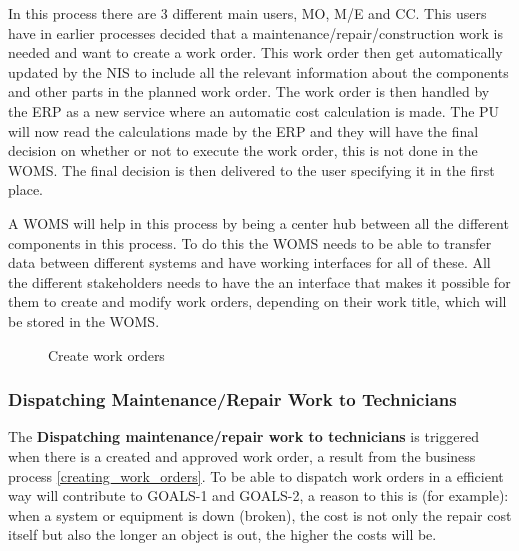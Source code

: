 In this process there are 3 different main users, MO, M/E and CC. This users have in earlier processes decided that a maintenance/repair/construction work is needed and want to create a work order. This work order then get automatically updated by the NIS to include all the relevant information about the components and other parts in the planned work order. The work order is then handled by the ERP as a new service where an automatic cost calculation is made. The PU will now read the calculations made by the ERP and they will have the final decision on whether or not to execute the work order, this is not done in the WOMS. The final decision is then delivered to the user specifying it in the first place.

A WOMS will help in this process by being a center hub between all the different components in this process. To do this the WOMS needs to be able to transfer data between different systems and have working interfaces for all of these. All the different stakeholders needs to have the an interface that makes it possible for them to create and modify work orders, depending on their work title, which will be stored in the WOMS.
\begin{figure}[H]
	\centering
	\setlength\fboxsep{7pt}
	\setlength\fboxrule{0.5pt}
	\label{fig:create}
	\caption{Create work orders}
\end{figure}
%
\subsubsection{Dispatching Maintenance/Repair Work to Technicians}
\label{sec:bp3}
The \textbf{Dispatching maintenance/repair work to technicians} is triggered when there is a created and approved work order, a result from the business process \ref{creating_work_orders}. To be able to dispatch work orders in a efficient way will contribute to GOALS-1 and GOALS-2, a reason to this is (for example): when a system or equipment is down (broken), the cost is not only the repair cost itself but also the longer an object is out, the higher the costs will be.

